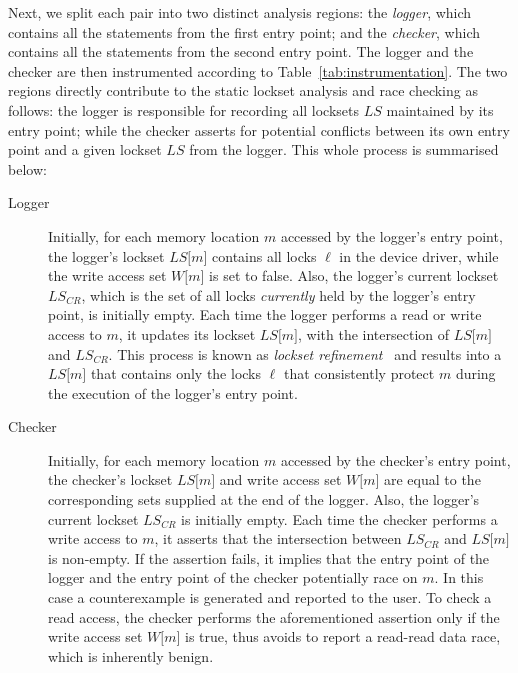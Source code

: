 Next, we split each pair into two distinct analysis regions: the \emph{logger}, which contains all the statements from the first entry point; and the \emph{checker}, which contains all the statements from the second entry point. The logger and the checker are then instrumented according to Table~\ref{tab:instrumentation}. The two regions directly contribute to the static lockset analysis and race checking as follows: the logger is responsible for recording all locksets $\mathit{LS}$ maintained by its entry point; while the checker asserts for potential conflicts between its own entry point and a given lockset $\mathit{LS}$ from the logger. This whole process is summarised below:

\begin{description}
  \item[Logger] Initially, for each memory location $m$ accessed by the logger's entry point, the logger's lockset $\mathit{LS}\lbrack m\rbrack$ contains all locks $\ell$ in the device driver, while the write access set $W\lbrack m\rbrack$ is set to false. Also, the logger's current lockset $\mathit{LS}_{CR}$, which is the set of all locks \emph{currently} held by the logger's entry point, is initially empty. Each time the logger performs a read or write access to $m$, it updates its lockset $\mathit{LS}\lbrack m\rbrack$, with the intersection of $\mathit{LS}\lbrack m\rbrack$ and $\mathit{LS}_{CR}$. This process is known as \emph{lockset refinement}~\cite{savage1997eraser} and results into a $\mathit{LS}\lbrack m\rbrack$ that contains only the locks $\ell$ that consistently protect $m$ during the execution of the logger's entry point.
  
  \item[Checker] Initially, for each memory location $m$ accessed by the checker's entry point, the checker's lockset $\mathit{LS}\lbrack m\rbrack$ and write access set $W\lbrack m\rbrack$ are equal to the corresponding sets supplied at the end of the logger. Also, the logger's current lockset $\mathit{LS}_{CR}$ is initially empty. Each time the checker performs a write access to $m$, it asserts that the intersection between $\mathit{LS}_{CR}$ and $\mathit{LS}\lbrack m\rbrack$ is non-empty. If the assertion fails, it implies that the entry point of the logger and the entry point of the checker potentially race on $m$. In this case a counterexample is generated and reported to the user. To check a read access, the checker performs the aforementioned assertion only if the write access set $W\lbrack m\rbrack$ is true, thus avoids to report a read-read data race, which is inherently benign.
\end{description}

